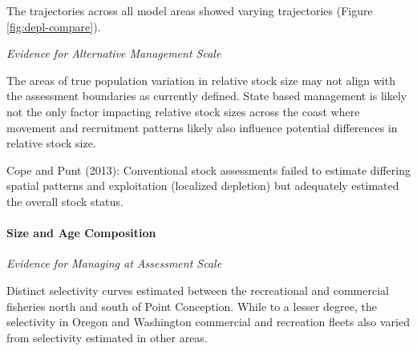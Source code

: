 \documentclass[11pt,
  english,
  a4paper,
]{article}
\begin{document}
The trajectories across all model areas showed varying trajectories (Figure \ref{fig:depl-compare}).

\leavevmode\tagmcend\tagstructend\par

\clearpage


\emph{Evidence for Alternative Management Scale}

\leavevmode\tagmcend\tagstructend\par


The areas of true population variation in relative stock size may not align with the assessment boundaries as currently defined. State based management is likely not the only factor impacting relative stock sizes across the coast where movement and recruitment patterns likely also influence potential differences in relative stock size.

\leavevmode\tagmcend\tagstructend\par


Cope and Punt {(2013)\leavevmode\tagmcend\tagstructend}: Conventional stock assessments failed to estimate differing spatial patterns and exploitation (localized depletion) but adequately estimated the overall stock status.

\leavevmode\tagmcend\tagstructend\par


\hypertarget{size-and-age-composition}{%
\paragraph{Size and Age Composition}\label{size-and-age-composition}}

\leavevmode\tagmcend\tagstructend


\emph{Evidence for Managing at Assessment Scale}

\leavevmode\tagmcend\tagstructend\par


Distinct selectivity curves estimated between the recreational and commercial fisheries north and south of Point Conception. While to a lesser degree, the selectivity in Oregon and Washington commercial and recreation fleets also varied from selectivity estimated in other areas.
\end{document}
